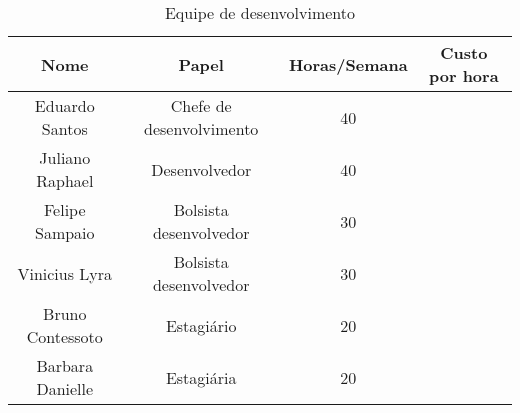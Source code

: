 \begin{table}[H]
\centering
\begin{tabular}{|c|c|c|c|}
\hline
	\textbf{Nome} &
	\textbf{Papel} &
	\textbf{Horas/Semana} &
	\textbf{Custo por hora}
	\\ \hline
	Eduardo Santos &
	Chefe de desenvolvimento &
	40 &

	\\ \hline
	Juliano Raphael &
	Desenvolvedor &
	40 &

	\\ \hline
	Felipe Sampaio &
	Bolsista desenvolvedor &
	30 &

	\\ \hline
	Vinicius Lyra &
	Bolsista desenvolvedor &
	30 &

	\\ \hline
	Bruno Contessoto &
	Estagiário &
	20 &

	\\ \hline
	Barbara Danielle &
	Estagiária &
	20 &

	\\ \hline
\end{tabular}
\caption{Equipe de desenvolvimento}
\label{tab:equipe_desenvolvimento}
\end{table}
